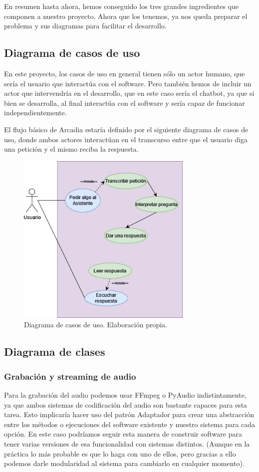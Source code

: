En resumen hasta ahora, hemos conseguido los tres grandes ingredientes que componen a nuestro proyecto. Ahora que los tenemos, ya nos queda preparar el problema y sus diagramas para facilitar el desarrollo.

\subsection{Diagrama de casos de uso}
En este proyecto, los casos de uso en general tienen sólo un actor humano, que sería el usuario que interactúa con el software. Pero también hemos de incluir un actor que intervendría en el desarrollo, que en este caso sería el chatbot, ya que si bien se desarrolla, al final interactúa con el software y sería capaz de funcionar independientemente.

El flujo básico de Arcadia estaría definido por el siguiente diagrama de casos de uso, donde ambos actores interactúan en el transcurso entre que el usuario diga una petición y el mismo reciba la respuesta.

\begin{figure}[H]
	\includegraphics[width=0.75\textwidth]{imagenes/DiagramaCasosUso.png}
	\caption{Diagrama de casos de uso. Elaboración propia.}
\end{figure}

\subsection{Diagrama de clases}
\subsubsection{Grabación y streaming de audio}
Para la grabación del audio podemos usar FFmpeg \cite{ffmpeg} o PyAudio \cite{pyaudio} indistintamente, ya que ambos sistemas de codificación del audio son bastante capaces para esta tarea. Esto implicaría hacer uso del patrón Adaptador para crear una abstracción entre los métodos o ejecuciones del software existente y nuestro sistema para cada opción.
En este caso podríamos seguir esta manera de construir software para tener varias versiones de esa funcionalidad con sistemas distintos. (Aunque en la práctica lo más probable es que lo haga con uno de ellos, pero gracias a ello podemos darle modularidad al sistema para cambiarlo en cualquier momento).

